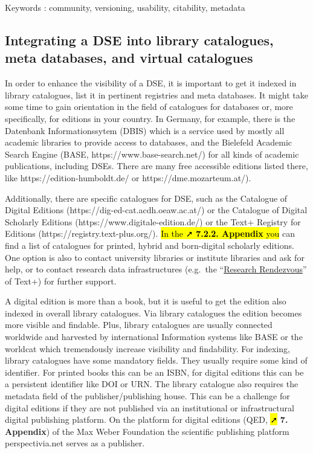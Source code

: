 \documentclass[
  letterpaper,
  DIV=11,
  numbers=noendperiod]{scrreprt}
\begin{document}
Keywords : community, versioning, usability, citability, metadata

\subsection{Integrating a DSE into library catalogues, meta databases,
and virtual
catalogues}\label{integrating-a-dse-into-library-catalogues-meta-databases-and-virtual-catalogues}

In order to enhance the visibility of a DSE, it is important to get it
indexed in library catalogues, list it in pertinent registries and meta
databases. It might take some time to gain orientation in the field of
catalogues for databases or, more specifically, for editions in your
country. In Germany, for example, there is the Datenbank
Informationssytem (DBIS) which is a service used by mostly all academic
libraries to provide access to databases, and the Bielefeld Academic
Search Engine (BASE, https://www.base-search.net/) for all kinds of
academic publications, including DSEs. There are many free accessible
editions listed there, like https://edition-humboldt.de/ or
https://dme.mozarteum.at/).

Additionally, there are specific catalogues for DSE, such as the
Catalogue of Digital Editions (https://dig-ed-cat.acdh.oeaw.ac.at/) or
the Catalogue of Digital Scholarly Editions
(https://www.digitale-edition.de/) or the Text+ Registry for Editions
(https://registry.text-plus.org/). \hl{In the ➚ \textbf{7.2.2. Appendix}
you} can find a list of catalogues for printed, hybrid and born-digital
scholarly editions. One option is also to contact university libraries
or institute libraries and ask for help, or to contact research data
infrastructures (e.g.~the
``\href{https://text-plus.org/en/daten-dienste/consulting/\#research-rendezvous}{Research
Rendezvous}'' of Text+) for further support.\hl{}

A digital edition is more than a book, but it is useful to get the
edition also indexed in overall library catalogues. Via library
catalogues the edition becomes more visible and findable. Plus, library
catalogues are usually connected worldwide and harvested by
international Information systems like BASE or the worldcat which
tremendously increase visibility and findability. For indexing, library
catalogues have some mandatory fields. They usually require some kind of
identifier. For printed books this can be an ISBN, for digital editions
this can be a persistent identifier like DOI or URN. The library
catalogue also requires the metadata field of the publisher/publishing
house. This can be a challenge for digital editions if they are not
published via an institutional or infrastructural digital publishing
platform. On the platform for digital editions (QED, \hl{➚} \textbf{7.
Appendix}) of the Max Weber Foundation the scientific publishing
platform perspectivia.net serves as a publisher.
\end{document}
